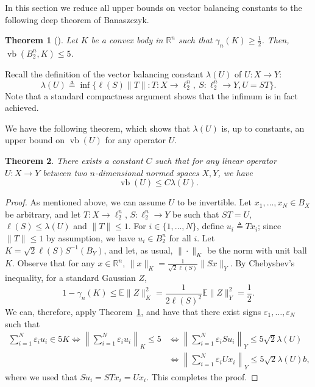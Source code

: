\documentclass[11pt]{article}
\newtheorem{theorem}{Theorem}
\newcommand{\R}{{\mathbb{R}}}
\newcommand{\E}{\mathbb{E}}
\newcommand\eps{\varepsilon}
\newcommand{\eqdef}{\triangleq}
\DeclareMathOperator{\vb}{vb}
\begin{document}
In this section we reduce all upper bounds on vector balancing
constants to the following deep theorem of Banaszczyk.
\begin{theorem}[\cite{bana}]\label{thm:bana}
  Let $K$ be a convex body in $\R^n$ such that $\gamma_n(K) \ge
  \frac12$. Then, $\vb(B_2^n, K) \le 5$.
\end{theorem}

Recall the definition of the vector balancing constant $\lambda(U)$ of
$U:X \to Y$: 
\[
\lambda(U) \eqdef \inf \{\ell(S)\|T\|: T: X \to \ell_2^n,\ S: \ell_2^n
\to Y, U = ST\}.
\]
Note that a standard compactness argument shows that the infimum is in fact achieved. 

We have the following theorem, which shows that $\lambda(U)$ is, up to
constants, an upper bound on $\vb(U)$ for any operator $U$. 

\begin{theorem}\label{thm:factorization}
  There exists a constant $C$ such that for any linear operator $U:X
  \to Y$ between two $n$-dimensional normed spaces $X, Y$, we have
  \[
  \vb(U) \le C\lambda(U).
  \]
\end{theorem}
\begin{proof}
  As mentioned above, we can assume $U$ to be invertible.  Let $x_1,
  \ldots, x_N \in B_X$ be arbitrary, and let $T:X \to \ell_2^n$,
  $S:\ell_2^n \to Y$ be such that $ST = U$, $\ell(S)\le \lambda(U)$
  and $\|T\| \le 1$. For $i \in \{1, \ldots, N\}$, define $u_i \eqdef
  Tx_i$; since $\|T\| \le 1$ by assumption, we have $u_i \in B_2^n$
  for all $i$. Let $K = \sqrt{2}\ell(S) S^{-1}(B_Y)$, and let, as
  usual, $\|\cdot\|_K$ be the norm with unit ball $K$. Observe that
  for any $x \in \R^n$, $\|x\|_K =
  \frac{1}{\sqrt{2}\ell(S)}\|Sx\|_Y$. By Chebyshev's inequality, for a
  standard Gaussian $Z$,
  \[
  1 - \gamma_n(K)  \le \E\|Z\|_K^2 
  =   \frac{1}{2\ell(S)^2} \E\|Z\|_Y^2 = \frac12.
  \]
  We can, therefore, apply Theorem~\ref{thm:bana}, and have that there
  exist signs $\eps_1, \ldots, \eps_N$ such that 
  \begin{align*}
  \sum_{i =1}^N{\eps_i u_i} \in 5K
  \iff
  \left\|\sum_{i =1}^N{\eps_i u_i}\right\|_K \le 5
  &\iff 
  \left\|\sum_{i = 1}^N{\eps_i Su_i}\right\|_Y \le 5\sqrt{2}\lambda(U)\\
  &\iff   \left\|\sum_{i = 1}^N{\eps_i Ux_i}\right\|_Y \le 5\sqrt{2}\lambda(U)b,
  \end{align*}
  where we used that $Su_i = STx_i = Ux_i$.
  This completes the proof.
\end{proof}
\end{document}

